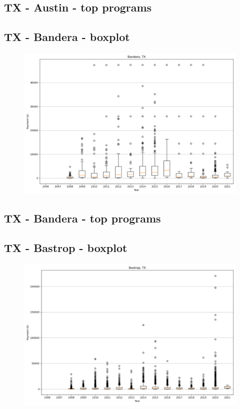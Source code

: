 \subsection*{TX - Austin - top programs}

\newpage
\subsection*{TX - Bandera - boxplot}
\begin{figure}[h]
\centering
\includegraphics[width=7in]{../output/boxplots/counties/Bandera-TX_boxplot.png}
\end{figure}


\subsection*{TX - Bandera - top programs}

\newpage
\subsection*{TX - Bastrop - boxplot}
\begin{figure}[h]
\centering
\includegraphics[width=7in]{../output/boxplots/counties/Bastrop-TX_boxplot.png}
\end{figure}



